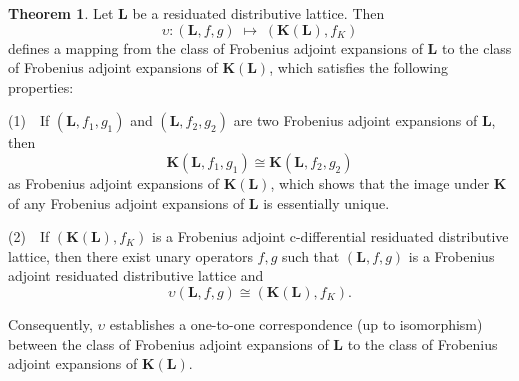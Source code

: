 \documentclass[final,12pt,times]{elsarticle}
\theoremstyle{plain}
\theoremstyle{definition}
\newtheorem{theorem}[definition]{Theorem}
\theoremstyle{break}
\begin{document}
\begin{theorem}\label{theorem4.6} Let $\mathbf{L}$ be a residuated distributive lattice. Then
\[
\upsilon : (\mathbf L,f,g) \; \longmapsto \; (\mathbf{K(L)},f_K)
\]
defines a mapping from the class of  Frobenius adjoint expansions of $\mathbf L$ to the class of Frobenius adjoint expansions of $\mathbf{K(L)}$, which satisfies the following properties:


    
   (1)~~If $(\mathbf{L}, f_1, g_1)$ and $(\mathbf{L}, f_2, g_2)$ are two Frobenius adjoint expansions of $\mathbf{L}$, then
    \[
    \mathbf{K}(\mathbf{L}, f_1, g_1) \cong \mathbf{K}(\mathbf{L}, f_2, g_2)
    \]
    as Frobenius adjoint expansions of $\mathbf{K}(\mathbf{L})$, which shows that the image under $\mathbf{K}$ of any Frobenius adjoint expansions of $\mathbf{L}$ is essentially unique.


   (2)~~If $(\mathbf{K(L)}, f_K)$ is a Frobenius adjoint c-differential residuated distributive lattice, then there exist unary operators $f,g$ such that $(\mathbf{L}, f, g)$ is a Frobenius adjoint residuated distributive lattice and
    \[
   \upsilon(\mathbf{L}, f, g) \cong (\mathbf{K(L)}, f_K).
    \]

Consequently, $\upsilon$ establishes a one-to-one correspondence (up to isomorphism) between the class of Frobenius adjoint expansions of $\mathbf{L}$ to the class of Frobenius adjoint expansions of $\mathbf{K(L)}$.
\end{theorem}
\end{document}
